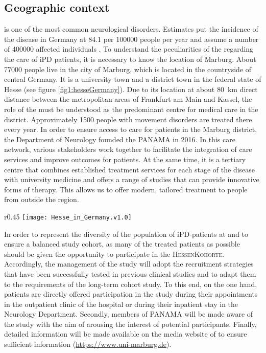 \subsection{Geographic context}
 is one of the most common neurological disorders. Estimates put the incidence of the disease in Germany at \SI[round-precision = 1]{84.1}{} per \num[round-precision = 0, round-mode = places]{100000}{} people per year and assume a number of \num[round-precision = 0, round-mode = places]{400000}{} affected individuals \citep{nerius2017parkinson}. To understand the peculiarities of the \UKM{} regarding the care of \ac{iPD} patients, it is necessary to know the location of Marburg. About \SI[round-precision = 0, round-mode=places]{77000}{} people live in the city of Marburg, which is located in the countryside of central Germany. It is a university town and a district town in the federal state of Hesse (see figure \ref{fig1:hesseGermany}). Due to its location at about 80~km direct distance between the metropolitan areas of Frankfurt am Main and Kassel, the role of the \UKM must be understood as the predominant centre for medical care in the district. Approximately \num[round-precision = 0, round-mode = places]{1500}{} people with movement disorders are treated there every year. In order to ensure access to care for patients in the Marburg district, the Department of Neurology founded the \ac{PANAMA} in 2016. In this care network, various stakeholders work together to facilitate the integration of care services and improve outcomes for patients. At the same time, it is a tertiary centre that combines established treatment services for each stage of the disease with university medicine and offers a range of studies that can provide innovative forms of therapy. This allows us to offer modern, tailored treatment to people from outside the region.

\begin{wrapfigure}{r}{0.45\textwidth}
    \centering
    \texttt{[image: Hesse\_in\_Germany.v1.0]}
    \caption{Location of Hesse in the German Federal Republic}
    \label{fig1:hesseGermany}
\end{wrapfigure}

In order to represent the diversity of the population of \ac{iPD}-patients at \UKM and to ensure a balanced study cohort, as many of the treated patients as possible should be given the opportunity to participate in the \textsc{HessenKohorte}. Accordingly, the management of the study will adopt the recruitment strategies that have been successfully tested in previous clinical studies and to adapt them to the requirements of the long-term cohort study. To this end, on the one hand, patients are directly offered participation in the study during their appointments in the outpatient clinic of the hospital or during their inpatient stay in the Neurology Department. Secondly, members of \ac{PANAMA} will be made aware of the study with the aim of arousing the interest of potential participants. Finally, detailed information will be made available on the media website of \UKM to ensure sufficient information (\url{https://www.uni-marburg.de}).
\newpage

